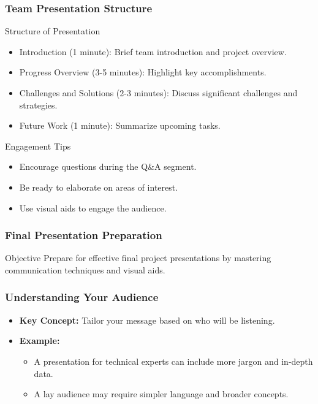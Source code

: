 \documentclass[aspectratio=169]{beamer}
\begin{document}
\begin{frame}[fragile]
    \frametitle{Team Presentation Structure}
    \begin{block}{Structure of Presentation}
    \begin{itemize}
        \item Introduction (1 minute): Brief team introduction and project overview.
        \item Progress Overview (3-5 minutes): Highlight key accomplishments.
        \item Challenges and Solutions (2-3 minutes): Discuss significant challenges and strategies.
        \item Future Work (1 minute): Summarize upcoming tasks.
    \end{itemize}
    \end{block}
    
    \begin{block}{Engagement Tips}
    \begin{itemize}
        \item Encourage questions during the Q\&A segment.
        \item Be ready to elaborate on areas of interest.
        \item Use visual aids to engage the audience.
    \end{itemize}
    \end{block}
\end{frame}

\begin{frame}[fragile]
    \frametitle{Final Presentation Preparation}
    \begin{block}{Objective}
        Prepare for effective final project presentations by mastering communication techniques and visual aids.
    \end{block}
\end{frame}

\begin{frame}[fragile]
    \frametitle{Understanding Your Audience}
    \begin{itemize}
        \item \textbf{Key Concept:} Tailor your message based on who will be listening.
        \item \textbf{Example:} 
        \begin{itemize}
            \item A presentation for technical experts can include more jargon and in-depth data.
            \item A lay audience may require simpler language and broader concepts.
        \end{itemize}
    \end{itemize}
\end{frame}
\end{document}
